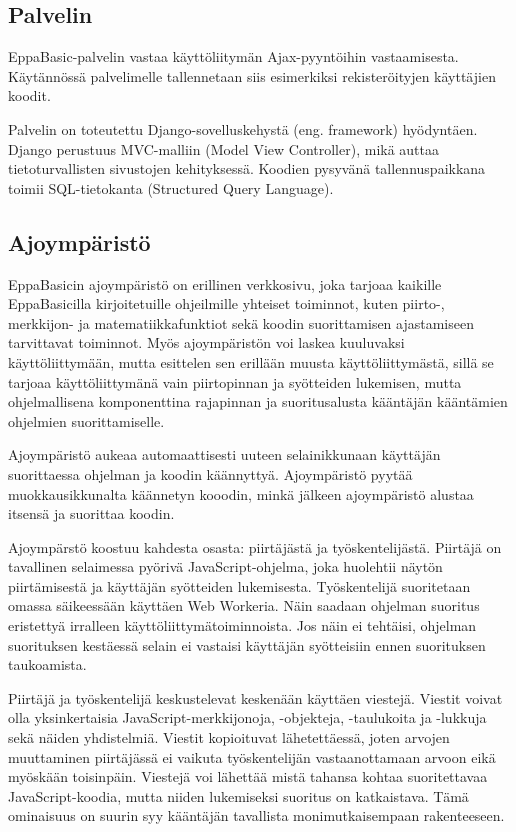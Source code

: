 \subsection{Palvelin}
EppaBasic-palvelin vastaa käyttöliitymän Ajax-pyyntöihin
vastaamisesta. Käytännössä palvelimelle tallennetaan
siis esimerkiksi rekisteröityjen käyttäjien koodit.

Palvelin on toteutettu Django-sovelluskehystä (eng. framework)
hyödyntäen. Django perustuus MVC-malliin (Model View Controller),
mikä auttaa tietoturvallisten sivustojen kehityksessä. Koodien
pysyvänä tallennuspaikkana toimii SQL-tietokanta (Structured Query Language).

\subsection{Ajoympäristö}
EppaBasicin ajoympäristö on erillinen verkkosivu,
joka tarjoaa kaikille EppaBasicilla kirjoitetuille
ohjeilmille yhteiset toiminnot, kuten piirto-,
merkkijon- ja matematiikkafunktiot sekä
koodin suorittamisen ajastamiseen tarvittavat toiminnot.
Myös ajoympäristön voi laskea kuuluvaksi käyttöliittymään,
mutta esittelen sen erillään muusta käyttöliittymästä,
sillä se tarjoaa käyttöliittymänä vain piirtopinnan
ja syötteiden lukemisen, mutta ohjelmallisena
komponenttina rajapinnan ja suoritusalusta kääntäjän
kääntämien ohjelmien suorittamiselle.

Ajoympäristö aukeaa automaattisesti uuteen selainikkunaan
käyttäjän suorittaessa ohjelman ja koodin käännyttyä.
Ajoympäristö pyytää muokkausikkunalta käännetyn kooodin,
minkä jälkeen ajoympäristö alustaa itsensä ja suorittaa koodin.

Ajoympärstö koostuu kahdesta osasta:
piirtäjästä ja työskentelijästä.
Piirtäjä on tavallinen selaimessa pyörivä
JavaScript-ohjelma, joka huolehtii
näytön piirtämisestä ja käyttäjän syötteiden lukemisesta.
Työskentelijä suoritetaan omassa säikeessään
käyttäen Web Workeria.
Näin saadaan ohjelman suoritus eristettyä
irralleen käyttöliittymätoiminnoista.
Jos näin ei tehtäisi, ohjelman suorituksen
kestäessä selain ei vastaisi käyttäjän
syötteisiin ennen suorituksen taukoamista.

Piirtäjä ja työskentelijä keskustelevat
keskenään käyttäen viestejä.
Viestit voivat olla yksinkertaisia
JavaScript-merkkijonoja,
-objekteja, -taulukoita ja -lukkuja
sekä näiden yhdistelmiä.
Viestit kopioituvat lähetettäessä,
joten arvojen muuttaminen piirtäjässä
ei vaikuta työskentelijän vastaanottamaan
arvoon eikä myöskään toisinpäin.
Viestejä voi lähettää mistä tahansa kohtaa
suoritettavaa JavaScript-koodia,
mutta niiden lukemiseksi suoritus on katkaistava.
Tämä ominaisuus on suurin syy kääntäjän
tavallista monimutkaisempaan rakenteeseen.

